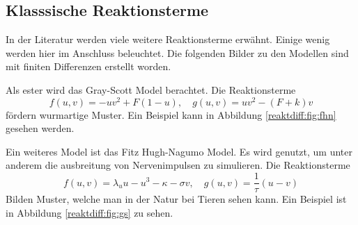 


\subsection{Klasssische Reaktionsterme}
In der Literatur werden viele weitere Reaktionsterme erwähnt.
Einige wenig werden hier im Anschluss beleuchtet.
Die folgenden Bilder zu den Modellen sind mit finiten Differenzen erstellt worden.

Als ester wird das Gray-Scott Model berachtet.
Die Reaktionsterme
\begin{equation}
     f(u,v) = -uv^2 + F(1 - u), \quad g(u,v) = uv^2 - (F + k)v
     \label{reaktdiff:equ:fhn}
\end{equation}
fördern wurmartige Muster.
Ein Beispiel kann in Abbildung \ref{reaktdiff:fig:fhn} gesehen werden.


Ein weiteres Model ist das Fitz Hugh-Nagumo Model.
Es wird genutzt, um unter anderem die ausbreitung von Nervenimpulsen zu simulieren.
Die Reaktionsterme
\begin{equation}
    f(u,v) = \lambda_u u - u^3 - \kappa - \sigma v, \quad g(u,v) = \frac{1}{\tau}(u - v)
    \label{reaktdiff:equ:gs}
\end{equation}
Bilden Muster, welche man in der Natur bei Tieren sehen kann.
Ein Beispiel ist in Abbildung \ref{reaktdiff:fig:gs} zu sehen.

